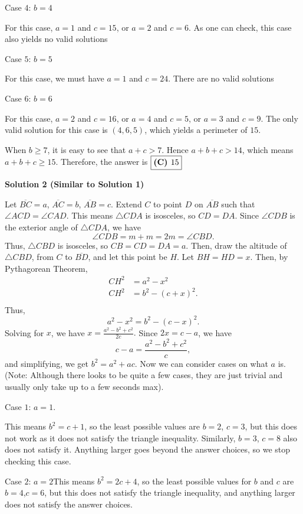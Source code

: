 \begin{enumerate}
 Case $4$: $b=4$

 For this case, $a=1$ and $c=15$, or $a=2$ and $c=6$. As one can check, this case also yields no valid solutions

 Case $5$: $b=5$

 For this case, we must have $a=1$ and $c=24$. There are no valid solutions

 Case $6$: $b=6$

 For this case, $a=2$ and $c=16$, or $a=4$ and $c=5$, or $a=3$ and $c=9$. The only valid solution for this case is $(4, 6, 5)$, which yields a perimeter of $15$.

 When $b\ge 7$, it is easy to see that $a+c>7$. Hence $a+b+c>14$, which means $a+b+c\ge15$. Therefore, the answer is $\fbox{\textbf{(C) }15}$




\textbf{Solution 2 (Similar to Solution 1)}

Let $\overline{BC}=a$, $\overline{AC}=b$, $\overline{AB}=c$. Extend $C$ to point $D$ on $\overline{AB}$ such that $\angle ACD = \angle CAD$. This means $\triangle CDA$ is isosceles, so $CD=DA$. Since $\angle CDB$ is the exterior angle of $\triangle CDA$, we have 
 \[\angle CDB=m+m=2m=\angle CBD.\] Thus, $\triangle CBD$ is isosceles, so $CB=CD=DA=a.$ Then, draw the altitude of $\triangle CBD$, from $C$ to $\overline{BD}$, and let this point be $H$. Let $BH=HD=x$. Then, by Pythagorean Theorem, \begin{align*}CH^2&=a^2-x^2 \\CH^2&= b^2 - (c+x)^2.\\\end{align*}
Thus, 
 \[a^2-x^2=b^2-(c-x)^2.\] Solving for $x$, we have $x=\frac{a^2-b^2+c^2}{2c}.$ Since $2x=c-a$, we have 
 \[c-a=\frac{a^2-b^2+c^2}{c},\] and simplifying, we get $b^2=a^2+ac.$ Now we can consider cases on what $a$ is. (Note: Although there looks to be quite a few cases, they are just trivial and usually only take up to a few seconds max).

 Case $1$: $a=1$.

 This means $b^2=c+1$, so the least possible values are $b=2$, $c=3$, but this does not work as it does not satisfy the triangle inequality. Similarly, $b=3$, $c=8$ also does not satisfy it. Anything larger goes beyond the answer choices, so we stop checking this case.

 Case $2$: $a=2$This means $b^2=2c+4$, so the least possible values for $b$ and $c$ are $b=4$,$c=6$, but this does not satisfy the triangle inequality, and anything larger does not satisfy the answer choices.


\end{enumerate}
